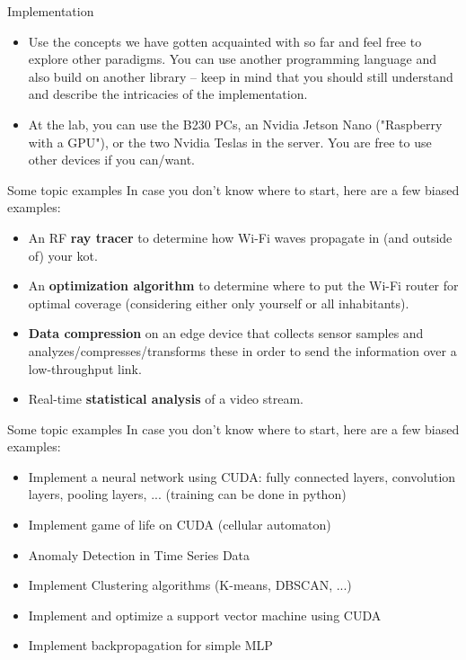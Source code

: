 \documentclass[11pt,t]{beamer}
\begin{document}
\begin{frame}{Implementation} 

\begin{itemize}\setlength\itemsep{0.75em}
\item Use the concepts we have gotten acquainted with so far and feel free to explore other paradigms. You can use another programming language and also build on another library -- keep in mind that you should still understand and describe the intricacies of the implementation.
\item At the lab, you can use the B230 PCs, an Nvidia Jetson Nano ("Raspberry with a GPU"), or the two Nvidia Teslas in the server. You are free to use other devices if you can/want.
\end{itemize}

\end{frame}


\begin{frame}{Some topic examples} 
In case you don't know where to start, here are a few biased examples:
\vspace{2mm}
\begin{itemize}\setlength\itemsep{0.5em}
    \item An RF \textbf{ray tracer} to determine how Wi-Fi waves propagate in (and outside of) your kot.
    \item An \textbf{optimization algorithm} to determine where to put the Wi-Fi router for optimal coverage (considering either only yourself or all inhabitants).
    \item \textbf{Data compression} on an edge device that collects sensor samples and analyzes/compresses/transforms these in order to send the information over a low-throughput link.
    \item Real-time \textbf{statistical analysis} of a video stream.
\end{itemize}
\end{frame}

\begin{frame}{Some topic examples} 
    In case you don't know where to start, here are a few biased examples:
    \vspace{2mm}
    \begin{itemize}\setlength\itemsep{0.5em}
        \item Implement a neural network using CUDA: fully connected layers, convolution layers, pooling layers, ... (training can be done in python)
        \item Implement game of life on CUDA (cellular automaton)
        \item Anomaly Detection in Time Series Data
        \item Implement Clustering algorithms (K-means, DBSCAN, ...)
        \item Implement and optimize a support vector machine using CUDA
        \item Implement backpropagation for simple MLP
    \end{itemize}
    \end{frame}
\end{document}
